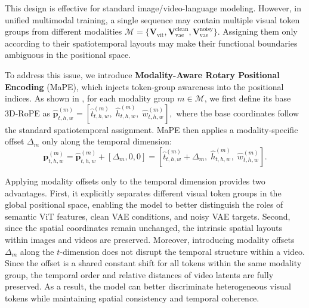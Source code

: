 \medskip
This design is effective for standard image/video-language modeling. However, in unified multimodal training, a single sequence may contain multiple visual token groups from different modalities $\mathcal{M}=\{\mathbf{V}_{\mathrm{vit}}, \mathbf{V}_{\mathrm{vae}}^{\mathrm{clean}}, \mathbf{V}_{\mathrm{vae}}^{\mathrm{noisy}} \}$.
 Assigning them only according to their spatiotemporal layouts may make their functional boundaries ambiguous in the positional space.





To address this issue, we introduce \textbf{Modality-Aware Rotary Positional Encoding} (MaPE),  which injects token-group awareness into the positional indices. As shown in , for each modality group $m \in \mathcal{M}$, we first define its base 3D-RoPE as
$\hat{\mathbf{p}}^{(m)}_{t,h,w}
=
[\hat{t}^{(m)}_{t,h,w},\;
 \hat{h}^{(m)}_{t,h,w},\;
 \hat{w}^{(m)}_{t,h,w}],$
where the base coordinates follow the standard spatiotemporal assignment. MaPE then applies a modality-specific offset $\Delta_m$ only along the temporal dimension:
\begin{equation}
\mathbf{p}^{(m)}_{t,h,w}
=
\hat{\mathbf{p}}^{(m)}_{t,h,w}
+
[\Delta_m, 0, 0]
=
[
\hat{t}^{(m)}_{t,h,w}+\Delta_m,\;
\hat{h}^{(m)}_{t,h,w},\;
\hat{w}^{(m)}_{t,h,w}
].
\end{equation}

Applying modality offsets only to the temporal dimension provides two advantages. First, it explicitly separates different visual token groups in the global positional space, enabling the model to better distinguish the roles of semantic ViT features, clean VAE conditions, and noisy VAE targets. Second, since the spatial coordinates remain unchanged, the intrinsic spatial layouts within images and videos are preserved. 
Moreover, introducing modality offsets $\Delta_m$ along the $t$-dimension does not disrupt the temporal structure within a video. Since the offset is a shared constant shift for all tokens within the same modality group, the temporal order and relative distances of video latents are fully preserved.
As a result, the model can better discriminate heterogeneous visual tokens while maintaining spatial consistency and temporal coherence.



